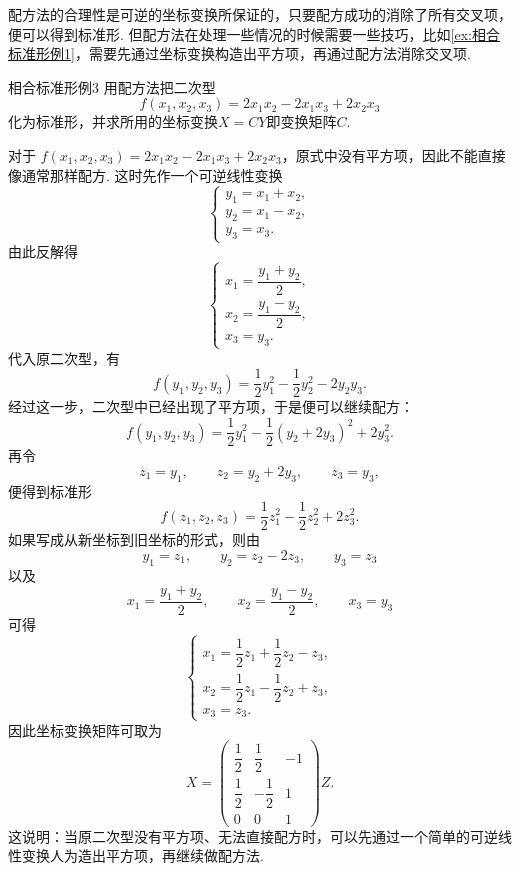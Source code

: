 配方法的合理性是可逆的坐标变换所保证的，只要配方成功的消除了所有交叉项，便可以得到标准形. 但配方法在处理一些情况的时候需要一些技巧，比如\autoref{ex:相合标准形例1}，需要先通过坐标变换构造出平方项，再通过配方法消除交叉项.

\begin{example}{}{相合标准形例3}
    用配方法把二次型
    \[f(x_1,x_2,x_3)=2x_1x_2-2x_1x_3+2x_2x_3\]
    化为标准形，并求所用的坐标变换$X=CY$即变换矩阵$C$.
\end{example}

\begin{solution}
    对于 $f(x_1,x_2,x_3)=2x_1x_2-2x_1x_3+2x_2x_3$，原式中没有平方项，因此不能直接像通常那样配方. 这时先作一个可逆线性变换
    \[
        \begin{cases}
            y_1 = x_1+x_2, \\
            y_2 = x_1-x_2, \\
            y_3 = x_3.
        \end{cases}
    \]
    由此反解得
    \[
        \begin{cases}
            x_1 = \dfrac{y_1+y_2}{2}, \\
            x_2 = \dfrac{y_1-y_2}{2}, \\
            x_3 = y_3.
        \end{cases}
    \]
    代入原二次型，有
    \[ f(y_1, y_2, y_3) = \frac{1}{2}y_1^2-\frac{1}{2}y_2^2-2y_2y_3. \]
    经过这一步，二次型中已经出现了平方项，于是便可以继续配方：
    \[ f(y_1, y_2, y_3) = \frac{1}{2}y_1^2-\frac{1}{2}(y_2+2y_3)^2+2y_3^2. \]
    再令
    \[
        z_1=y_1,\qquad z_2=y_2+2y_3,\qquad z_3=y_3,
    \]
    便得到标准形
    \[
        f(z_1,z_2,z_3)=\frac{1}{2}z_1^2-\frac{1}{2}z_2^2+2z_3^2.
    \]
    如果写成从新坐标到旧坐标的形式，则由
    \[
        y_1=z_1,\qquad y_2=z_2-2z_3,\qquad y_3=z_3
    \]
    以及
    \[
        x_1=\frac{y_1+y_2}{2},\qquad x_2=\frac{y_1-y_2}{2},\qquad x_3=y_3
    \]
    可得
    \[
        \begin{cases}
            x_1 = \dfrac{1}{2}z_1+\dfrac{1}{2}z_2-z_3, \\
            x_2 = \dfrac{1}{2}z_1-\dfrac{1}{2}z_2+z_3, \\
            x_3 = z_3.
        \end{cases}
    \]
    因此坐标变换矩阵可取为
    \[
        X=
        \begin{pmatrix}
            \dfrac{1}{2} & \dfrac{1}{2} & -1 \\
            \dfrac{1}{2} & -\dfrac{1}{2} & 1 \\
            0 & 0 & 1
        \end{pmatrix}
        Z.
    \]
    这说明：当原二次型没有平方项、无法直接配方时，可以先通过一个简单的可逆线性变换人为造出平方项，再继续做配方法.
\end{solution}

